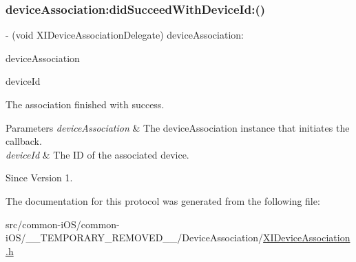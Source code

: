 \subsubsection{\texorpdfstring{device\+Association\+:did\+Succeed\+With\+Device\+Id\+:()}{deviceAssociation:didSucceedWithDeviceId:()}}
{\footnotesize\ttfamily -\/ (void X\+I\+Device\+Association\+Delegate) device\+Association\+: \begin{DoxyParamCaption}\item[{(id$<$ X\+I\+Device\+Association $>$)}]{device\+Association }\item[{didSucceedWithDeviceId:(N\+S\+String $\ast$)}]{device\+Id }\end{DoxyParamCaption}}



The association finished with success. 


\begin{DoxyParams}{Parameters}
{\em device\+Association} & The device\+Association instance that initiates the callback. \\
\hline
{\em device\+Id} & The ID of the associated device. \\
\hline
\end{DoxyParams}
\begin{DoxySince}{Since}
Version 1. 
\end{DoxySince}


The documentation for this protocol was generated from the following file\+:\begin{DoxyCompactItemize}
\item 
src/common-\/i\+O\+S/common-\/i\+O\+S/\+\_\+\+\_\+\+T\+E\+M\+P\+O\+R\+A\+R\+Y\+\_\+\+R\+E\+M\+O\+V\+E\+D\+\_\+\+\_\+/\+Device\+Association/\hyperlink{_x_i_device_association_8h}{X\+I\+Device\+Association.\+h}\end{DoxyCompactItemize}
